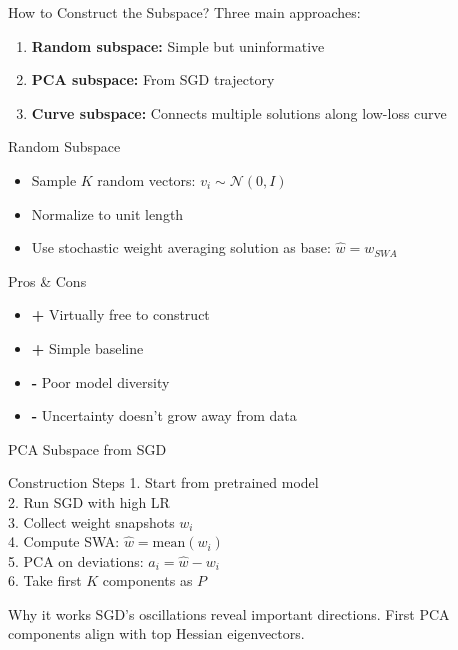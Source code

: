 \documentclass{beamer}
\begin{document}
\begin{frame}{How to Construct the Subspace?}
Three main approaches:
\begin{enumerate}
    \item \textbf{Random subspace:} Simple but uninformative
    \item \textbf{PCA subspace:} From SGD trajectory
    \item \textbf{Curve subspace:} Connects multiple solutions along low-loss curve
\end{enumerate}
\end{frame}

\begin{frame}{Random Subspace}

\begin{itemize}
\item Sample $K$ random vectors: $v_i \sim \mathcal{N}(0,I)$
\item Normalize to unit length
\item Use stochastic weight averaging solution as base: $\hat{w} = w_{SWA}$
\end{itemize}

\begin{block}{Pros \& Cons}
\begin{itemize}
\item \textbf{+} Virtually free to construct
\item \textbf{+} Simple baseline
\item \textbf{-} Poor model diversity
\item \textbf{-} Uncertainty doesn't grow away from data
\end{itemize}
\end{block}

\end{frame}

\begin{frame}{PCA Subspace from SGD}

\begin{block}{Construction Steps}
1. Start from pretrained model \\
2. Run SGD with high LR \\
3. Collect weight snapshots $w_i$ \\
4. Compute SWA: $\hat{w} = \text{mean}(w_i)$ \\
5. PCA on deviations: $a_i = \hat{w} - w_i$ \\
6. Take first $K$ components as $P$
\end{block}

\begin{block}{Why it works}
SGD's oscillations reveal important directions. First PCA components align with top Hessian eigenvectors.
\end{block}

\end{frame}
\end{document}
